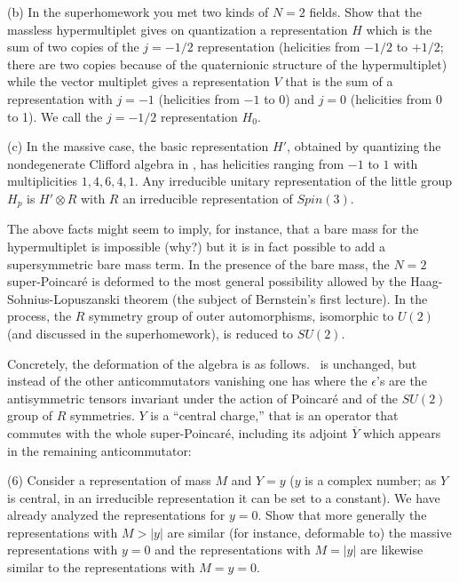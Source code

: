 (b) In the superhomework you met two kinds of $N=2$ fields.
Show that the massless
hypermultiplet gives on quantization a representation $H$ which
is the sum of two copies of the $j=-1/2$ representation
(helicities from $-1/2$ to $+1/2$; there are two copies
because of the quaternionic structure of the hypermultiplet)
while the vector multiplet gives a representation $V$
that is the sum of a representation with $j=-1$
(helicities from $-1$ to 0) and $j=0$ (helicities from 0 to 1).  We call the
$j=-1/2$ representation $H_0$.

(c) In the massive case, the basic representation $H'$, obtained
by quantizing the nondegenerate Clifford algebra in \jozo, has helicities
ranging from $-1$ to $1$ with multiplicities $1,4,6,4,1$.  
Any irreducible
unitary representation of the little group $H_p$ 
is $H'\otimes R$ with $R$ an irreducible representation of $Spin(3)$.


 The above facts might seem to imply, for instance, that a bare
mass for the hypermultiplet is impossible (why?) but it is in fact possible
to add a supersymmetric bare mass term.  In the presence of the bare
mass, the $N=2$ super-Poincar\'e is deformed to the most general possibility
allowed by the Haag-Sohnius-Lopuszanski theorem (the subject of Bernstein's
first lecture).  
In the process, the $R$ symmetry group of outer automorphisms, isomorphic
to $U(2)$ (and discussed in the superhomework), is reduced to $SU(2)$.

Concretely, the deformation of the algebra is as follows.
\jozo\ is unchanged, but instead of the other anticommutators
vanishing one has
\eqn{}
where the $\epsilon$'s are the antisymmetric tensors invariant
under the action of Poincar\'e and of the $SU(2)$ group of $R$ symmetries.
$Y$ is a ``central charge,'' that is an operator that commutes with
the whole super-Poincar\'e, including its adjoint $\overline Y$ which
appears in the remaining anticommutator:
\eqn{}

(6) Consider a representation of mass $M$ and $Y=y$ ($y$ is a complex number;
as $Y$ is central, in an irreducible representation it can be set to a 
constant).
We have already analyzed the representations for $y=0$.  Show
that more generally the representations with $M>|y|$ are similar (for
instance, deformable to)  the
massive representations with $y=0$ and the representations with $M=|y|$ are
likewise similar to the representations with $M=y=0$.  

